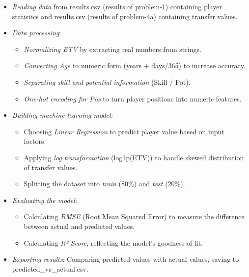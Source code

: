 \documentclass[12pt]{article}
\begin{document}
\begin{itemize}
    \item \textit{Reading data} from results.csv (results of problem-1) containing player statistics and results.csv (results of problem-4a) containing transfer values.
    \item \textit{Data processing}:
    
    \begin{itemize}
        \item \textit{Normalizing ETV} by extracting real numbers from strings.
        \item \textit{Converting Age} to numeric form (years + days/365) to increase accuracy.
        \item \textit{Separating skill and potential information} (Skill / Pot).
        \item \textit{One-hot encoding for Pos} to turn player positions into numeric features.
    \end{itemize}
    
    \item \textit{Building machine learning model:}
    
    \begin{itemize}
        \item Choosing \textit{Linear Regression} to predict player value based on input factors.
        \item Applying \textit{log transformation} (log1p(ETV)) to handle skewed distribution of transfer values.
        \item Splitting the dataset into \textit{train} (80\%) and \textit{test} (20\%).
    \end{itemize}
    
    \item \textit{Evaluating the model:}
    
    \begin{itemize}
        \item Calculating \textit{RMSE} (Root Mean Squared Error) to measure the difference between actual and predicted values.
        \item Calculating \textit{R² Score}, reflecting the model's goodness of fit.
    \end{itemize}
    
    \item \textit{Exporting results}: Comparing predicted values with actual values, saving to predicted\_vs\_actual.csv.
\end{itemize}
\end{document}
